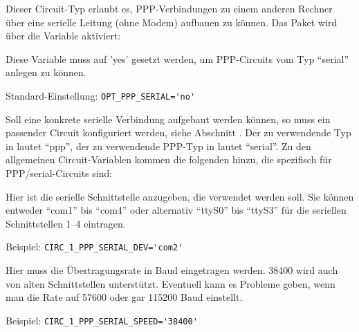 
Dieser Circuit-Typ erlaubt es, PPP-Verbindungen zu einem anderen Rechner über
eine serielle Leitung (ohne Modem) aufbauen zu können. Das Paket wird über die
Variable  aktiviert:

\begin{description}

Diese Variable muss auf 'yes' gesetzt werden, um PPP-Circuits vom Typ ``serial''
anlegen zu können.

Standard-Einstellung: \verb+OPT_PPP_SERIAL='no'+
\end{description}

Soll eine konkrete serielle Verbindung aufgebaut werden können, so muss ein
passender Circuit konfiguriert werden, siehe Abschnitt
. Der zu verwendende Typ in
 lautet ``ppp'', der zu verwendende PPP-Typ in
 lautet ``serial''. Zu den allgemeinen Circuit-Variablen
kommen die folgenden hinzu, die spezifisch für PPP/serial-Circuits sind:

\begin{description}


Hier ist die serielle Schnittstelle anzugeben, die verwendet werden soll. Sie
können entweder ``com1'' bis ``com4'' oder alternativ ``ttyS0'' bis ``ttyS3''
für die seriellen Schnittstellen 1--4 eintragen.

Beispiel: \verb+CIRC_1_PPP_SERIAL_DEV='com2'+


Hier muss die Übertragungsrate in Baud eingetragen werden. 38400 wird auch von
alten Schnittstellen unterstützt. Eventuell kann es Probleme geben, wenn man die
Rate auf 57600 oder gar 115200 Baud einstellt.

Beispiel: \verb+CIRC_1_PPP_SERIAL_SPEED='38400'+

\end{description}


